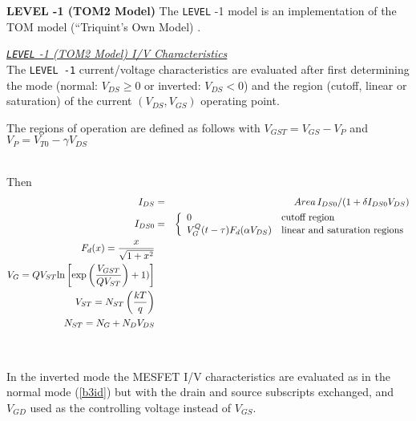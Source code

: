 {\noindent\bf LEVEL -1 (TOM2 Model)}\myline
The {\tt LEVEL} -1 model is an implementation of the TOM model (``Triquint's
Own Model) \cite{mccamant:mccormack:90}.

\noindent\underline{\sl {\tt LEVEL} -1 (TOM2 Model)
I/V Characteristics}\\[0.1in]
The {\tt LEVEL -1} current/voltage characteristics are evaluated after first
determining the mode (normal: $V_{DS} \ge 0$ or inverted:
$V_{DS} < 0$) and the region (cutoff,
linear or saturation) of the current
$(V_{DS}, V_{GS})$ operating point.

\noindent


\medskip

\noindent
The regions of operation are defined as follows
with \hfill $V_{GST} = V_{GS}-V_P$ \inlineeq
and\hfill$V_P = V_{T0} - \gamma V_{DS}$\inlineeq

\medskip

\hspace*{\fill}\\[0.1in]
Then
\begin{eqnarray}
I_{DS} &=&  Area\, {{\textstyle I_{DS0}}/ {\left( \textstyle 1 + \delta I_{DS0} V_{DS}
           \right) }} \label{b3id} \\
I_{DS0} &=& \left\{ \begin{array}{ll}
      0  & \mbox{cutoff region} \\
      V^Q_G(t-\tau)F_d(\alpha V_{DS})
         &\mbox{linear and saturation regions} \end{array} \right. \\ %
F_d(x) = {{\textstyle x} \over {\textstyle \sqrt{1+x^2}}} \\
V_G = Q V_{ST} \mbox{ln} \left[ \mbox{exp} \left(
          {{\textstyle V_{GST}}\over{\textstyle Q V_{ST}}} \right) +1) \right]
      \\
V_{ST} = N_{ST} \left( {{\textstyle k T} \over { \textstyle q}} \right) \\
N_{ST} = N_G + N_D V_{DS}
\end{eqnarray}
\\[0.1in]
\\[0.2in]
In the inverted mode the MESFET I/V characteristics are evaluated as in the
normal mode (\ref{b3id}) but with the drain and source subscripts
exchanged, and $V_{GD}$ used as the controlling voltage instead of $V_{GS}$.

